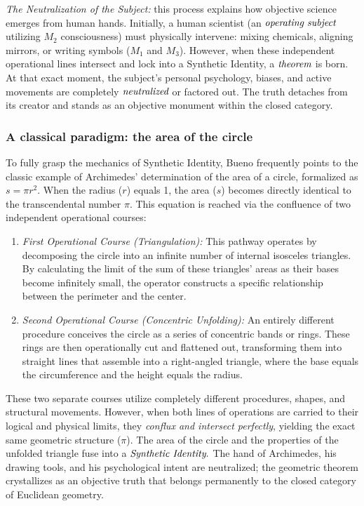 \documentclass[11pt, a4paper]{article}
\begin{document}
\emph{The Neutralization of the Subject:} this process explains how objective science emerges from human hands. Initially, a human scientist (an \(\emph{operating subject}\) utilizing \(M_2\) consciousness) must physically intervene: mixing chemicals, aligning mirrors, or writing symbols (\(M_1\) and \(M_3\)). However, when these independent operational lines intersect and lock into a Synthetic Identity, a \(\emph{theorem}\) is born. At that exact moment, the subject's personal psychology, biases, and active movements are completely \(\emph{neutralized}\) or factored out. The truth detaches from its creator and stands as an objective monument within the closed category.


\subsubsection*{A classical paradigm: the area of the circle}
To fully grasp the mechanics of Synthetic Identity, Bueno frequently points to the classic example of Archimedes' determination of the area of a circle, formalized as \(s = \pi r^2\). When the radius (\(r\)) equals 1, the area (\(s\)) becomes directly identical to the transcendental number \(\pi\). This equation is reached via the confluence of two independent operational courses:

\begin{enumerate}
\item \emph{First Operational Course (Triangulation):} This pathway operates by decomposing the circle into an infinite number of internal isosceles triangles. By calculating the limit of the sum of these triangles' areas as their bases become infinitely small, the operator constructs a specific relationship between the perimeter and the center.

\item \emph{Second Operational Course (Concentric Unfolding):} An entirely different procedure conceives the circle as a series of concentric bands or rings. These rings are then operationally cut and flattened out, transforming them into straight lines that assemble into a right-angled triangle, where the base equals the circumference and the height equals the radius.
\end{enumerate}

These two separate courses utilize completely different procedures, shapes, and structural movements. However, when both lines of operations are carried to their logical and physical limits, they \emph{conflux and intersect perfectly}, yielding the exact same geometric structure (\(\pi\)). The area of the circle and the properties of the unfolded triangle fuse into a \(\emph{Synthetic Identity}.\) The hand of Archimedes, his drawing tools, and his psychological intent are neutralized; the geometric theorem crystallizes as an objective truth that belongs permanently to the closed category of Euclidean geometry.
\end{document}
